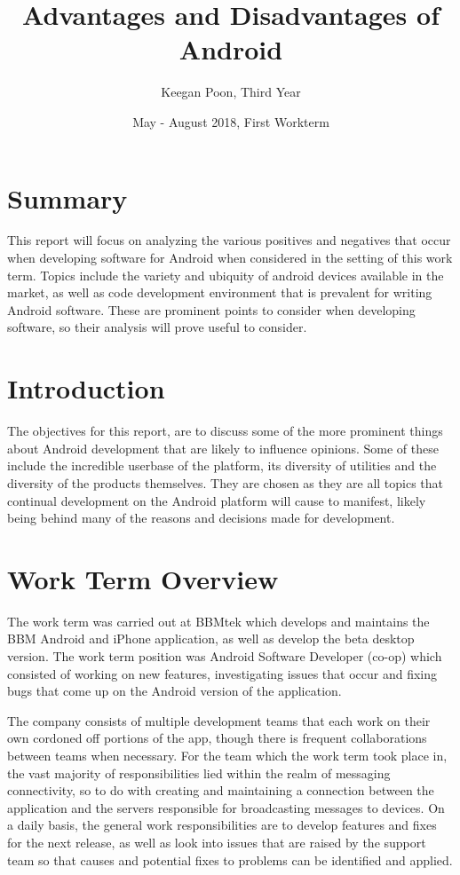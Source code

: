 \documentclass[12pt, letterpaper]{article}
\title{Advantages and Disadvantages of Android}
\author{Keegan Poon, Third Year}
\date{May - August 2018, First Workterm}
\begin{document}
 
\begin{titlepage}
\maketitle
\end{titlepage}
 
\section{Summary}
This report will focus on analyzing the various positives and negatives
that occur when developing software for Android when considered in the
setting of this work term. Topics include the variety and ubiquity of 
android devices available in the market, as well as code development 
environment that is prevalent for writing Android software. These are 
prominent points to consider when developing software, so their analysis
will prove useful to consider.

\newpage

\tableofcontents
\newpage

\section{Introduction}

The objectives for this report, are to discuss some of the more prominent
things about Android development that are likely to influence opinions.
Some of these include the incredible userbase of the platform, its
diversity of utilities and the diversity of the products themselves.
They are chosen as they are all topics that continual development on the
Android platform will cause to manifest, likely being behind many of
the reasons and decisions made for development.

\section{Work Term Overview}

The work term was carried out at BBMtek which develops and maintains the 
BBM Android and iPhone application, as well as develop the beta desktop 
version. The work term position was Android Software Developer (co-op) 
which consisted of working on new features, investigating issues that occur
and fixing bugs that come up on the Android version of the application.

The company consists of multiple development teams that each work on
their own cordoned off portions of the app, though there is frequent
collaborations between teams when necessary. For the team which the
work term took place in, the vast majority of responsibilities lied
within the realm of messaging connectivity, so to do with creating and
maintaining a connection between the application and the servers responsible
for broadcasting messages to devices. On a daily basis, the general work
responsibilities are to develop features and fixes for the next release, as
well as look into issues that are raised by the support team so that
causes and potential fixes to problems can be identified and applied.
\end{document}
